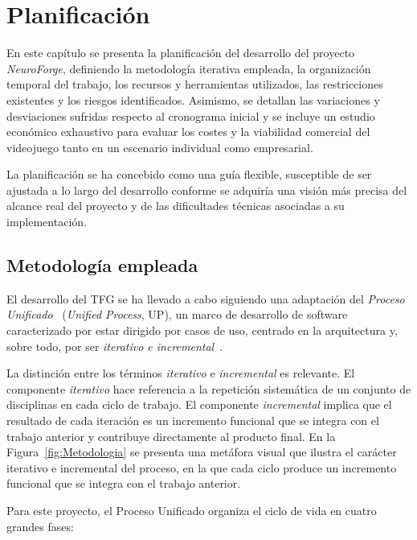 \chapter{Planificación}

En este capítulo se presenta la planificación del desarrollo del proyecto \textit{NeuroForge}, definiendo la metodología iterativa empleada, la organización temporal del trabajo, los recursos y herramientas utilizados, las restricciones existentes y los riesgos identificados. Asimismo, se detallan las variaciones y desviaciones sufridas respecto al cronograma inicial y se incluye un estudio económico exhaustivo para evaluar los costes y la viabilidad comercial del videojuego tanto en un escenario individual como empresarial.

La planificación se ha concebido como una guía flexible, susceptible de ser ajustada a lo largo del desarrollo conforme se adquiría una visión más precisa del alcance real del proyecto y de las dificultades técnicas asociadas a su implementación. 

\section{Metodología empleada}

El desarrollo del TFG se ha llevado a cabo siguiendo una adaptación del \textit{Proceso Unificado}~\cite{cabalar_metodologias} (\textit{Unified Process}, UP), un marco de desarrollo de software caracterizado por estar dirigido por casos de uso, centrado en la arquitectura y, sobre todo, por ser \textit{iterativo e incremental}~\cite{solano2020}.

La distinción entre los términos \textit{iterativo} e \textit{incremental} es relevante. El componente \textit{iterativo} hace referencia a la repetición sistemática de un conjunto de disciplinas en cada ciclo de trabajo. El componente \textit{incremental} implica que el resultado de cada iteración es un incremento funcional que se integra con el trabajo anterior y contribuye directamente al producto final. En la Figura~\ref{fig:Metodologia} se presenta una metáfora visual que ilustra el carácter iterativo e incremental del proceso, en la que cada ciclo produce un incremento funcional que se integra con el trabajo anterior.

Para este proyecto, el Proceso Unificado organiza el ciclo de vida en cuatro grandes fases:

